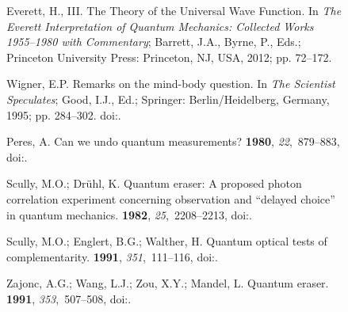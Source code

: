\documentclass[entropy,article,accept,oneauthor,pdftex]{Definitions/mdpi}
\begin{document}
\begin{figure}[H]
\begin{thebibliography}{999}
{Everett}, H., III.
\newblock The Theory of the Universal Wave Function. In {\em The {E}verett Interpretation of Quantum Mechanics: Collected Works 1955--1980 with Commentary}; Barrett, J.A., Byrne, P., Eds.; Princeton University Press: Princeton, NJ, USA, 2012; pp. 72--172.%

Wigner, E.P.
\newblock Remarks on the mind-body question. In {\em The Scientist Speculates};
  Good, I.J., Ed.; Springer: Berlin/Heidelberg, Germany, 1995; pp. 284--302. %
\newblock
  doi:{\href{https://doi.org/10.1007/978-3-642-78374-6\_20}{}}.

Peres, A.
\newblock Can we undo quantum measurements?
 {\bf 1980}, {\em 22},~879--883, doi:{\href{https://doi.org/10.1103/PhysRevD.22.879}{}}.

Scully, M.O.; Dr\"uhl, K.
\newblock Quantum eraser: A proposed photon correlation experiment concerning
  observation and ``delayed choice'' in quantum mechanics.
 {\bf 1982}, {\em 25},~2208--2213, doi:{\href{https://doi.org/10.1103/PhysRevA.25.2208}{}}.


Scully, M.O.; Englert, B.G.; Walther, H.
\newblock Quantum optical tests of complementarity.
 {\bf 1991}, {\em 351},~111--116, doi:{\href{https://doi.org/10.1038/351111a0}{}}.

Zajonc, A.G.; Wang, L.J.; Zou, X.Y.; Mandel, L.
\newblock Quantum eraser.
 {\bf 1991}, {\em 353},~507--508, doi:{\href{https://doi.org/10.1038/353507b0}{}}.


\end{thebibliography}
\end{figure}
\end{document}

